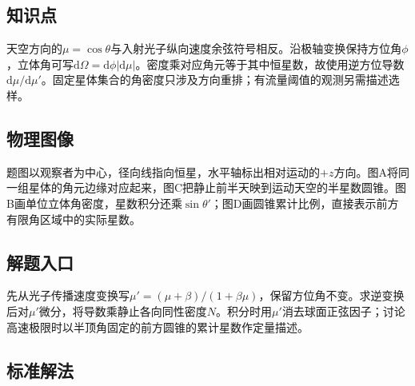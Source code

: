 \documentclass[UTF8,fontset=fandol,a4paper,11pt]{ctexart}
\begin{document}
\subsection*{知识点}

天空方向的$\mu=\cos\theta$与入射光子纵向速度余弦符号相反。沿极轴变换保持方位角$\phi$，立体角可写$\mathrm d\Omega=\mathrm d\phi|\mathrm d\mu|$。密度乘对应角元等于其中恒星数，故使用逆方位导数$\mathrm d\mu/\mathrm d\mu'$。固定星体集合的角密度只涉及方向重排；有流量阈值的观测另需描述选样。



\subsection*{物理图像}

题图以观察者为中心，径向线指向恒星，水平轴标出相对运动的$+z$方向。图A将同一组星体的角元边缘对应起来，图C把静止前半天映到运动天空的半星数圆锥。图B画单位立体角密度，星数积分还乘$\sin\theta'$；图D画圆锥累计比例，直接表示前方有限角区域中的实际星数。



\subsection*{解题入口}

先从光子传播速度变换写$\mu'=(\mu+\beta)/(1+\beta\mu)$，保留方位角不变。求逆变换后对$\mu'$微分，将导数乘静止各向同性密度$N$。积分时用$\mu'$消去球面正弦因子；讨论高速极限时以半顶角固定的前方圆锥的累计星数作定量描述。



\subsection*{标准解法}
\end{document}

